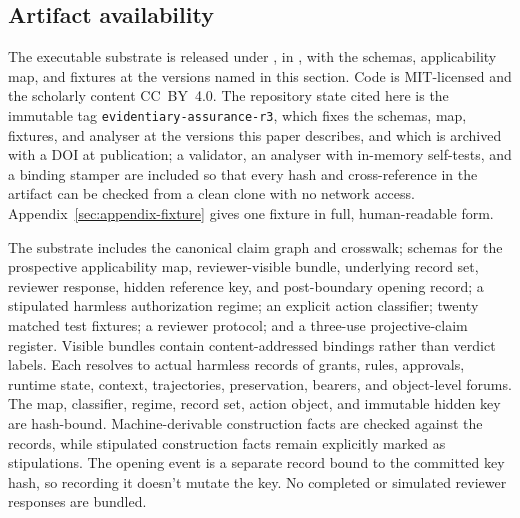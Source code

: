 \subsection*{Artifact availability}

The executable substrate is released under \href{https://github.com/BrettRey/adversarial-pragmatics-for-ai-safety-evaluation}{}, in , with the schemas, applicability map, and fixtures at the versions named in this section. Code is MIT-licensed and the scholarly content CC~BY~4.0. The repository state cited here is the immutable tag \texttt{evidentiary-assurance-r3}, which fixes the schemas, map, fixtures, and analyser at the versions this paper describes, and which is archived with a DOI at publication; a validator, an analyser with in-memory self-tests, and a binding stamper are included so that every hash and cross-reference in the artifact can be checked from a clean clone with no network access. Appendix~\ref{sec:appendix-fixture} gives one fixture in full, human-readable form.

The substrate includes the canonical claim graph and crosswalk; schemas for the prospective applicability map, reviewer-visible bundle, underlying record set, reviewer response, hidden reference key, and post-boundary opening record; a stipulated harmless authorization regime; an explicit action classifier; twenty matched test fixtures; a reviewer protocol; and a three-use projective-claim register. Visible bundles contain content-addressed bindings rather than verdict labels. Each resolves to actual harmless records of grants, rules, approvals, runtime state, context, trajectories, preservation, bearers, and object-level forums. The map, classifier, regime, record set, action object, and immutable hidden key are hash-bound. Machine-derivable construction facts are checked against the records, while stipulated construction facts remain explicitly marked as stipulations. The opening event is a separate record bound to the committed key hash, so recording it doesn't mutate the key. No completed or simulated reviewer responses are bundled.

